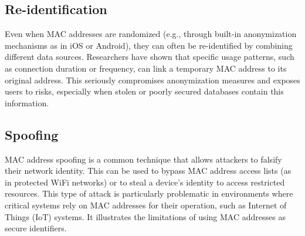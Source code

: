 \documentclass{article}
\begin{document}
  \subsection{\label{subsec:Reidentification}Re-identification}
  Even when MAC addresses are randomized (e.g., through built-in anonymization 
  mechanisms as in iOS or Android), they can often be re-identified by combining
  different data sources. Researchers have shown that specific usage patterns,
  such as connection duration or frequency, can link a temporary MAC address to its original address.
  This seriously compromises anonymization measures and exposes users to risks,
  especially when stolen or poorly secured databases contain this information.

  \subsection{\label{subsec:Spoofing}Spoofing}
  MAC address spoofing is a common technique that allows attackers to falsify their network identity.
  This can be used to bypass MAC address
  access lists (as in protected WiFi networks) or to steal a device's identity to access restricted resources.
  This type of attack is particularly problematic in environments where critical 
  systems rely on MAC addresses for their operation, such as Internet of Things (IoT) systems. 
  It illustrates the limitations of using MAC addresses as secure identifiers.
\end{document}
